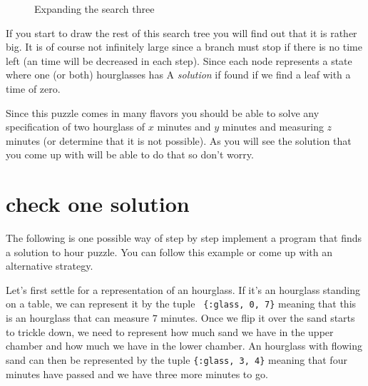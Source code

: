 \documentclass[a4paper,11pt]{article}
\begin{document}
\begin{figure}[h]
\center
{}
\caption{Expanding the search three}
\end{figure}

If you start to draw the rest of this search tree you will find out
that it is rather big. It is of course not infinitely large since a
branch must stop if there is no time left (an time will be decreased
in each step). Since each node represents a state where one (or both)
hourglasses has A {\em solution} if found if we find a leaf with a time
of zero.

Since this puzzle comes in many flavors you should be able to solve
any specification of two hourglass of $x$ minutes and $y$ minutes and
measuring $z$ minutes (or determine that it is not possible). As you
will see the solution that you come up with will be able to do that so
don't worry.

\section*{check one solution}

The following is one possible way of step by step implement a program
that finds a solution to hour puzzle. You can follow this example or
come up with an alternative strategy.

Let's first settle for a representation of an hourglass. If it's an
hourglass standing on a table, we can represent it by the tuple {\tt
  \{:glass, 0, 7\}} meaning that this is an hourglass that can measure $7$
minutes. Once we flip it over the sand starts to trickle down, we need
to represent how much sand we have in the upper chamber and how much
we have in the lower chamber. An hourglass with flowing sand can then
be represented by the tuple {\tt \{:glass, 3, 4\}} meaning that four
minutes have passed and we have three more minutes to go.
\end{document}
